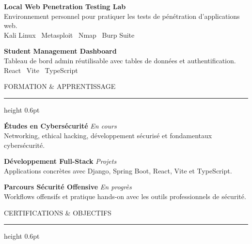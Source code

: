 \documentclass[10pt, a4paper]{article}
\newcommand{\mainheading}[1]{%
  \vspace{8pt}
  {\fontsize{7.5}{9}\selectfont\color{accent}\MakeUppercase{#1}}%
  \vspace{2pt}\newline
  {\color{rulecol}\hrule height 0.6pt}%
  \vspace{7pt}
}
\newcommand{\projecttitle}[1]{%
  {\fontsize{9}{11}\selectfont\bfseries\color{maintext} #1}%
}
\newcommand{\projdesc}[1]{%
  {\fontsize{8.5}{11}\selectfont\color{muted} #1}%
}
\newcommand{\edutitle}[1]{%
  {\fontsize{9}{11}\selectfont\bfseries\color{maintext} #1}%
}
\newcommand{\edusub}[1]{%
  {\fontsize{8}{10}\selectfont\color{muted} #1}%
}
\newcommand{\period}[1]{%
  \hfill{\fontsize{7.5}{9}\selectfont\color{accent}\textit{#1}}%
}
\begin{document}
\begin{minipage}[t]{0.67\textwidth}
\begin{minipage}[t]{0.94\linewidth}
\hspace{6pt}%
\begin{minipage}[t]{0.93\linewidth}
\projecttitle{Local Web Penetration Testing Lab}\\
\projdesc{Environnement personnel pour pratiquer les tests de pénétration d'applications web.}\\[2pt]
{\fontsize{7.5}{9}\selectfont\color{accent} Kali Linux \textbullet\ Metasploit \textbullet\ Nmap \textbullet\ Burp Suite}
\end{minipage}

\vspace{8pt}

\hspace{6pt}%
\begin{minipage}[t]{0.93\linewidth}
\projecttitle{Student Management Dashboard}\\
\projdesc{Tableau de bord admin réutilisable avec tables de données et authentification.}\\[2pt]
{\fontsize{7.5}{9}\selectfont\color{accent} React \textbullet\ Vite \textbullet\ TypeScript}
\end{minipage}

\mainheading{Formation \& Apprentissage}

\edutitle{Études en Cybersécurité}\period{En cours}\\
\edusub{Networking, ethical hacking, développement sécurisé et fondamentaux cybersécurité.}

\vspace{7pt}

\edutitle{Développement Full-Stack}\period{Projets}\\
\edusub{Applications concrètes avec Django, Spring Boot, React, Vite et TypeScript.}

\vspace{7pt}

\edutitle{Parcours Sécurité Offensive}\period{En progrès}\\
\edusub{Workflows offensifs et pratique hands-on avec les outils professionnels de sécurité.}

\mainheading{Certifications \& Objectifs}


\end{minipage}
\end{minipage}
\end{document}
